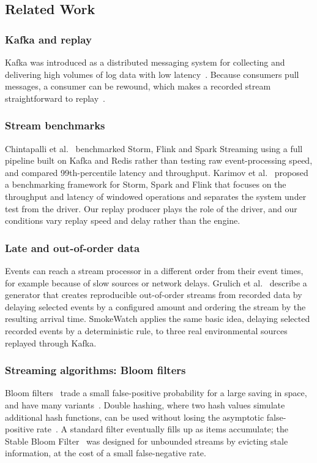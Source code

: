 \subsection{Related Work}

\subsubsection{Kafka and replay}
Kafka was introduced as a distributed messaging system for collecting and
delivering high volumes of log data with low latency~\cite{kreps2011kafka}.
Because consumers pull messages, a consumer can be rewound, which makes a
recorded stream straightforward to replay~\cite{kreps2011kafka}.

\subsubsection{Stream benchmarks}
Chintapalli et al.~\cite{chintapalli2016benchmarking} benchmarked Storm, Flink and
Spark Streaming using a full pipeline built on Kafka and Redis rather than testing
raw event-processing speed, and compared 99th-percentile latency and throughput.
Karimov et al.~\cite{karimov2018benchmarking} proposed a benchmarking framework for
Storm, Spark and Flink that focuses on the throughput and latency of windowed
operations and separates the system under test from the driver. Our replay
producer plays the role of the driver, and our conditions vary replay speed and
delay rather than the engine.

\subsubsection{Late and out-of-order data}
Events can reach a stream processor in a different order from their event times,
for example because of slow sources or network delays. Grulich et
al.~\cite{grulich2019generating} describe a generator that creates reproducible
out-of-order streams from recorded data by delaying selected events by a
configured amount and ordering the stream by the resulting arrival time. SmokeWatch
applies the same basic idea, delaying selected recorded events by a deterministic
rule, to three real environmental sources replayed through Kafka.

\subsubsection{Streaming algorithms: Bloom filters}
Bloom filters~\cite{bloom1970} trade a small false-positive probability for a large
saving in space, and have many variants~\cite{broder2004network}. Double hashing,
where two hash values simulate additional hash functions, can be used without
losing the asymptotic false-positive rate~\cite{kirsch2008less}. A standard filter
eventually fills up as items accumulate; the Stable Bloom
Filter~\cite{deng2006stable} was designed for unbounded streams by evicting stale
information, at the cost of a small false-negative rate.
